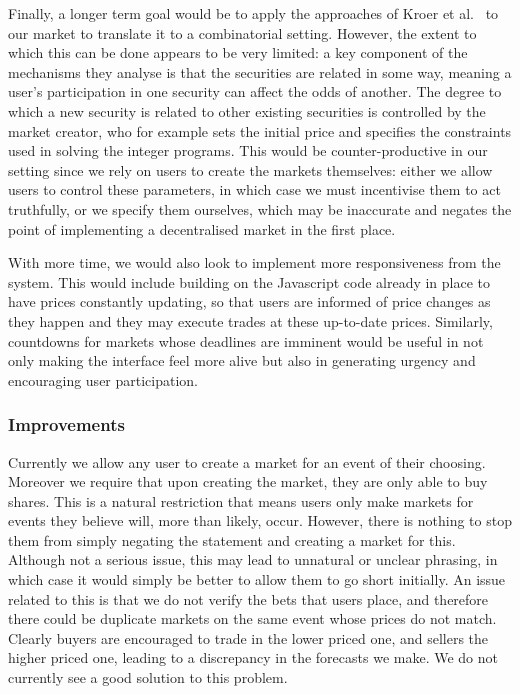 Finally, a longer term goal would be to apply the approaches of Kroer et
al.~\cite{Kroer2016} to our market to translate it to a combinatorial setting.
However, the extent to which this can be done appears to be very limited: a key
component of the mechanisms they analyse is that the securities are related in
some way, meaning a user's participation in one security can affect the odds of
another. The degree to which a new security is related to other existing
securities is controlled by the market creator, who for example sets the
initial price and specifies the constraints used in solving the integer
programs. This would be counter-productive in our setting since we rely on
users to create the markets themselves: either we allow users to control these
parameters, in which case we must incentivise them to act truthfully, or we
specify them ourselves, which may be inaccurate and negates the point of
implementing a decentralised market in the first place.

With more time, we would also look to implement more responsiveness from the 
system. This would include building on the Javascript code already in place to
have prices constantly updating, so that users are informed of price changes as
they happen and they may execute trades at these up-to-date prices. Similarly,
countdowns for markets whose deadlines are imminent would be useful in not only
making the interface feel more alive but also in generating urgency and
encouraging user participation.

\subsubsection{Improvements}

Currently we allow any user to create a market for an event of their choosing.
Moreover we require that upon creating the market, they are only able to buy
shares. This is a natural restriction that means users only make markets for
events they believe will, more than likely, occur. However, there is nothing to
stop them from simply negating the statement and creating a market for this.
Although not a serious issue, this may lead to unnatural or unclear phrasing,
in which case it would simply be better to allow them to go short initially.
An issue related to this is that we do not verify the bets that users place,
and therefore there could be duplicate markets on the same event whose prices
do not match. Clearly buyers are encouraged to trade in the lower priced one,
and sellers the higher priced one, leading to a discrepancy in the forecasts we
make. We do not currently see a good solution to this problem.

